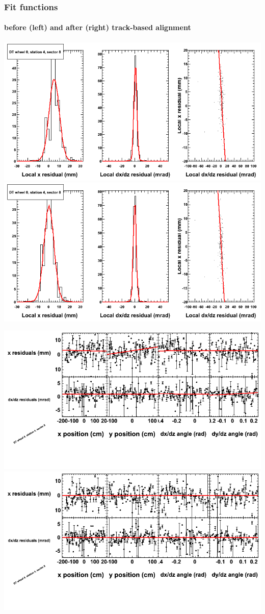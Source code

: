 \documentclass[compress]{beamer}
\begin{document}
\begin{frame}
\frametitle{Fit functions}
\framesubtitle{before (left) and after (right) track-based alignment}
\includegraphics[width=0.5\linewidth]{fitfunctions_re01/MBwhCst4sec08_bellcurves.png} \includegraphics[width=0.5\linewidth]{fitfunctions_re05/MBwhCst4sec08_bellcurves.png}

\includegraphics[width=0.5\linewidth]{fitfunctions_re01/MBwhCst4sec08_polynomials.png} \includegraphics[width=0.5\linewidth]{fitfunctions_re05/MBwhCst4sec08_polynomials.png}
\end{frame}
\end{document}
